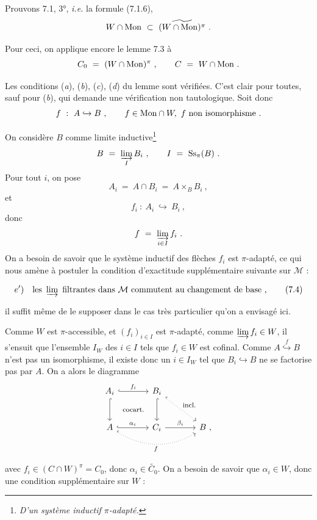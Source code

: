 Prouvons 7.1, 3°, \textit{i.e.} la formule (7.1.6),
\[
W \cap \mathrm{Mon} \ \subset \ \widetilde{(W \cap \mathrm{Mon})^{\pi}} \ .
\]

Pour ceci, on applique encore le lemme 7.3 à
\[
C_0 \ = \ (W \cap \Mon)^{\pi} \ , \qquad C \ = \ W \cap \Mon \ .
\]

Les conditions (\textit{a}), (\textit{b}), (\textit{c}), (\textit{d}) du lemme sont vérifiées. C'est clair pour toutes, sauf pour (\textit{b}), qui demande une vérification non tautologique. Soit donc
\[
f \ : \ A \hookrightarrow B \ , \qquad f \in \mathrm{Mon} \cap W,\ f \text{ non isomorphisme} \ .
\]

On considère $B$ comme limite inductive\footnote[33]{\textit{D'un système inductif $\pi$-adapté.}}
\[
B \ = \ \varinjlim_{I} B_i \ , \qquad I \ = \ \Ss_{\pi}(B) \ .
\]
Pour tout $i$, on pose
\[
A_i \ = \ A \cap B_i \ = \ A \times_B B_i \ ,
\]
et
\[
f_i \ : \ A_i \ \hookrightarrow \ B_i \ ,
\]
donc
\[
f \ = \ \varinjlim_{i \in I} f_i \ .
\]
On a besoin de savoir que le système inductif des flèches $f_i$ est $\pi$-adapté, ce qui nous amène à postuler la condition d'exactitude supplémentaire suivante sur $\mathcal{M}$ :

\[
e')\quad \text{les } \varinjlim \text{ filtrantes dans } \mathcal{M} \text{ commutent au changement de base}\ , \tag*{(7.4)}
\]

il suffit même de le supposer dans le cas très particulier qu'on a envisagé ici.

Comme $W$ est $\pi$-accessible, et $(f_i)_{i \in I}$ est $\pi$-adapté, comme $\varinjlim f_i \in W$, il s'ensuit que l'ensemble $I_W$ des $i \in I$ tels que $f_i \in W$ est cofinal. Comme $A \overset{f}{\hookrightarrow} B$ n'est pas un isomorphisme, il existe donc un $i \in I_W$ tel que $B_i \hookrightarrow B$ ne se factorise pas par $A$. On a alors le diagramme
\[
\begin{tikzcd}[row sep=large, column sep=large]
A_i \arrow[r, hook, "f_i"] \arrow[d, hook] \arrow[rd, phantom, "\text{\footnotesize cocart.}"] & B_i \arrow[d, hook] \arrow[rd, dotted, hook, "\text{\footnotesize incl.}"] & \\
A \arrow[r, hook, "\alpha_i"] \arrow[rr, dotted, hook, bend right, "f"'] & C_i \arrow[r, "\beta_i"] & B \ ,
\end{tikzcd}
\]

avec $f_i \in (C \cap W)^{\pi} = C_0$, donc $\alpha_i \in \widetilde{C_0}$. On a besoin de savoir que $\alpha_i \in W$, donc une condition supplémentaire sur $W$ :

